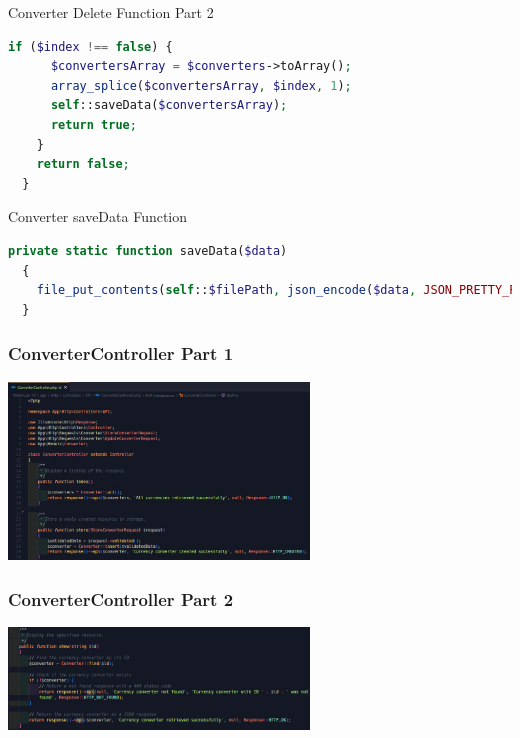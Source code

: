 \documentclass[aspectratio=169, table]{beamer}
\begin{document}
\begin{frame}[fragile]{Converter Delete Function Part 2}
\vskip1cm
\begin{lstlisting}[language=PHP]
    if ($index !== false) {
      $convertersArray = $converters->toArray();
      array_splice($convertersArray, $index, 1);
      self::saveData($convertersArray);
      return true;
    }
    return false;
  }
\end{lstlisting}
\end{frame}

\begin{frame}[fragile]{Converter saveData Function}
\vskip1cm
\begin{lstlisting}[language=PHP]
private static function saveData($data)
  {
    file_put_contents(self::$filePath, json_encode($data, JSON_PRETTY_PRINT));
  }
\end{lstlisting}
\end{frame}

\begin{frame}[fragile]
 \frametitle{ConverterController Part 1}
 \vskip1cm
 \begin{center}
  \includegraphics[width=0.6\textwidth]{classFiles/pertemuan-10-controller-part-1.png}
 \end{center}
\end{frame}

\begin{frame}[fragile]
 \frametitle{ConverterController Part 2}
 \vskip1cm
 \begin{center}
  \includegraphics[width=0.6\textwidth]{classFiles/pertemuan-10-controller-part-2.png}
 \end{center}
\end{frame}
\end{document}
